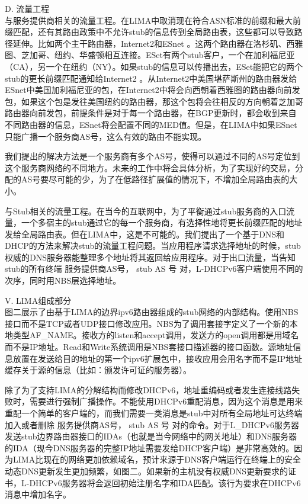 D.	流量工程\\
与服务提供商相关的流量工程。在LIMA中取消现在符合ASN标准的前缀和最大前缀匹配，还有其路由政策中不允许stub的信息传到全局路由表，这些都可以导致路径延伸。比如两个主干路由器，Internet2和ESnet 。这两个路由器在洛杉矶、西雅图、芝加哥、纽约、华盛顿相互连接。ESet有两个stub客户，一个在加利福尼亚（CA），另一个在纽约（NY）。如果stub的信息可以传播出去，ESet能把它的两个stub的更长前缀匹配通知给Internet2 。从Internet2中美国堪萨斯州的路由器发给ESnet中美国加利福尼亚的包，在Internet2中将会向西朝着西雅图的路由器向前发包，如果这个包是发往美国纽约的路由器，那这个包将会往相反的方向朝着芝加哥路由器向前发包，前提条件是对于每一个路由器，在BGP更新时，都会收到来自不同路由器的信息，ESnet将会配置不同的MED值。但是，在LIMA中如果ESnet只能广播一个服务商AS号，这么有效的路由不能实现。


我们提出的解决方法是一个服务商有多个AS号，使得可以通过不同的AS号定位到这个服务商网络的不同地方。未来的工作中将会具体分析，为了实现好的交易，分配的AS号要尽可能的少，为了在低路径扩展值的情况下，不增加全局路由表的大小。


与Stub相关的流量工程。在当今的互联网中，为了平衡通过stub服务商的入口流量，一个多宿主的stub通过它的每一个服务商，有选择性地将更长前缀匹配的地址发给全局路由表。但在LIMA中，这是不可能的。我们提出了一个基于DNS和DHCP的方法来解决stub的流量工程问题。当应用程序请求选择地址的时候，stub权威的DNS服务器能整理多个地址将其返回给应用程序。对于出口流量，当告知stub的所有终端{ 服务提供商AS号， stub AS 号 }对，L-DHCPv6客户端使用不同的次序，同时用NBS层选择地址。


V.	LIMA组成部分\\
图二展示了由基于LIMA的边界ipv6路由器组成的stub网络的内部结构。使用NBS接口而不是TCP或者UDP接口修改应用。NBS为了调用套接字定义了一个新的本地类型AF\_NAME。接收方的listen和accept调用，发送方的open调用都是用域名而不是IP地址。Read和Write系统调用是NBS套接口描述器的接口函数。源地址信息放置在发送给目的地址的第一个ipv6扩展包中，接收应用会用名字而不是IP地址缓存关于源的信息（比如：颁发许可证的服务器）。


除了为了支持LIMA的分解结构而修改DHCPv6，地址重编码或者发生连接线路失败时，需要进行强制广播操作。不能使用DHCPv6重配消息，因为这个消息是用来重配一个简单的客户端的，而我们需要一类消息是stub中对所有全局地址可达终端加入或者删除{ 服务提供商AS号， stub AS 号 }对的命令。对于L\_DHCPv6服务器发送stub边界路由器接口的IDAs（也就是当今网络中的网关地址）和DNS服务器的IDA（现今DNS服务器的完整IP地址需要发给DHCP客户端）是非常高效的。因为LIMA比现在的网络更加依赖域名，预计来源于DNS客户端运行在终端上的安全动态DNS更新发生更加频繁，如图二。如果新的主机没有权威DNS更新要求的证书，L-DHCPv6服务器将会返回初始注册名字和IDA匹配。该行为要求在DHCPv6消息中增加名字。


